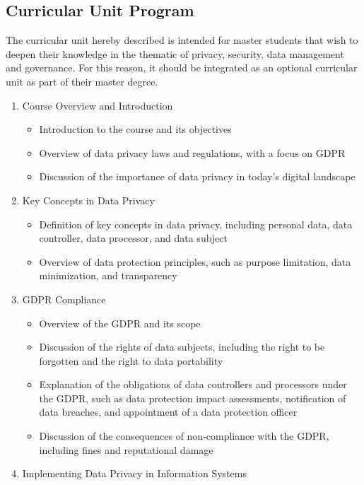 \documentclass[11pt]{article}
\begin{document}
\subsection{Curricular Unit Program}

The curricular unit hereby described is intended for master students that wish to deepen their knowledge in the thematic of privacy, security, data management and governance. For this reason, it should be integrated as an optional curricular unit as part of their master degree.

\begin{enumerate}
    \item Course Overview and Introduction
    \begin{itemize}
        \item Introduction to the course and its objectives
        \item Overview of data privacy laws and regulations, with a focus on GDPR
        \item Discussion of the importance of data privacy in today's digital landscape
    \end{itemize}
    \item Key Concepts in Data Privacy
    \begin{itemize}
        \item Definition of key concepts in data privacy, including personal data, data controller, data processor, and data subject
        \item Overview of data protection principles, such as purpose limitation, data minimization, and transparency
    \end{itemize}
    \item GDPR Compliance
    \begin{itemize}
        \item Overview of the GDPR and its scope
        \item Discussion of the rights of data subjects, including the right to be forgotten and the right to data portability
        \item Explanation of the obligations of data controllers and processors under the GDPR, such as data protection impact assessments, notification of data breaches, and appointment of a data protection officer
        \item Discussion of the consequences of non-compliance with the GDPR, including fines and reputational damage
    \end{itemize}
    \item Implementing Data Privacy in Information Systems

\end{enumerate}
\end{document}
